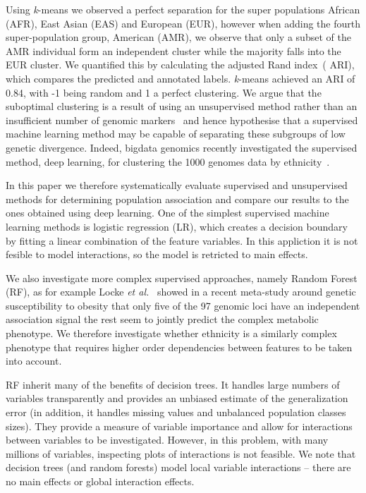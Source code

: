 \documentclass{llncs}
\newcommand{\kMeans}{\textit{k}-means }
\newcommand{\ARI}{adjusted Rand index}
\begin{document}
{Using \kMeans{} we observed a perfect separation for the super populations African (AFR), East Asian (EAS) and European
(EUR), however when adding the fourth super-population group, American (AMR), we observe that only a subset of the AMR
individual form an independent cluster while the majority falls into the EUR cluster.  We quantified this by calculating
the \ARI\ ( ARI), which compares the predicted and annotated labels. \kMeans achieved an ARI of 0.84, with -1 being
random and 1 a perfect clustering.  We argue that the suboptimal clustering is a result of using an unsupervised method
rather than an insufficient number of genomic markers~\cite{Patterson2006} and hence hypothesise that a supervised
machine learning method may be capable of separating these subgroups of low genetic divergence.  Indeed, bigdata
genomics recently investigated the supervised method, deep learning, for clustering the 1000 genomes data by
ethnicity~\cite{Ferguson}.  

In this paper we therefore systematically evaluate supervised and unsupervised methods for determining population
association and compare our results to the ones obtained using deep learning.
One of the simplest supervised machine learning methods is logistic regression (LR), which creates a decision boundary
by fitting a linear combination of the feature variables.  In this appliction it is not fesible to model interactions,
so the model is retricted to main effects. 

We also investigate more complex supervised
approaches, namely Random Forest (RF), as for example Locke {\it et al.}~\cite{Locke2015} showed in a recent meta-study
around genetic susceptibility to obesity that only five of the 97 genomic loci have an independent association signal
the rest seem to jointly predict the complex metabolic phenotype.  We therefore investigate whether ethnicity is a
similarly complex phenotype that requires higher order dependencies between features to be taken into
account. %

RF inherit many of the benefits of decision trees. It handles large numbers of variables transparently and
provides an unbiased estimate of the generalization error (in addition, it handles missing values and unbalanced
population classes sizes). They provide a measure of variable importance and allow for interactions between
variables to be investigated. However, in this problem, with many millions of variables, inspecting plots of interactions
is not feasible.  We note that decision trees (and random forests) model local variable interactions -- there are 
no main effects or global interaction effects. 

}
\end{document}
